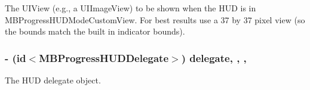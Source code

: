 The U\+I\+View (e.\+g., a U\+I\+Image\+View) to be shown when the H\+U\+D is in M\+B\+Progress\+H\+U\+D\+Mode\+Custom\+View. For best results use a 37 by 37 pixel view (so the bounds match the built in indicator bounds). \hypertarget{interface_m_b_progress_h_u_d_ad6fee32939fa55fc1a341aba117aa28f}{
\subsubsection[{delegate}]{\setlength{\rightskip}{0pt plus 5cm}-\/ (id$<${\bf M\+B\+Progress\+H\+U\+D\+Delegate}$>$) delegate\hspace{0.3cm}{\ttfamily [read]}, {\ttfamily [write]}, {\ttfamily [atomic]}, {\ttfamily [assign]}}}\label{interface_m_b_progress_h_u_d_ad6fee32939fa55fc1a341aba117aa28f}
The H\+U\+D delegate object.

